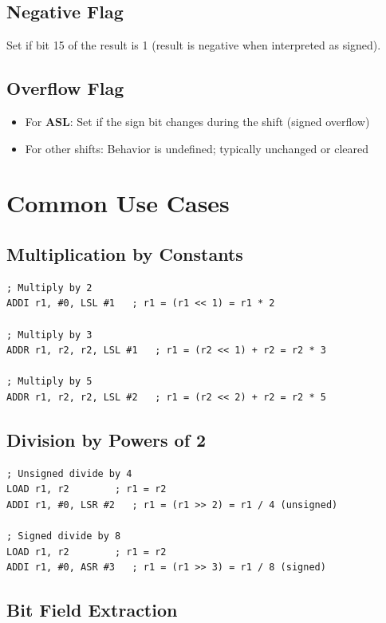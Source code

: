 \subsection{Negative Flag}

Set if bit 15 of the result is 1 (result is negative when interpreted as signed).

\subsection{Overflow Flag}

\begin{itemize}
	\item For \textbf{ASL}: Set if the sign bit changes during the shift (signed overflow)
	\item For other shifts: Behavior is undefined; typically unchanged or cleared
\end{itemize}

\section{Common Use Cases}

\subsection{Multiplication by Constants}

\begin{lstlisting}
; Multiply by 2
ADDI r1, #0, LSL #1   ; r1 = (r1 << 1) = r1 * 2

; Multiply by 3
ADDR r1, r2, r2, LSL #1   ; r1 = (r2 << 1) + r2 = r2 * 3

; Multiply by 5
ADDR r1, r2, r2, LSL #2   ; r1 = (r2 << 2) + r2 = r2 * 5
\end{lstlisting}

\subsection{Division by Powers of 2}

\begin{lstlisting}
; Unsigned divide by 4
LOAD r1, r2        ; r1 = r2
ADDI r1, #0, LSR #2   ; r1 = (r1 >> 2) = r1 / 4 (unsigned)

; Signed divide by 8
LOAD r1, r2        ; r1 = r2
ADDI r1, #0, ASR #3   ; r1 = (r1 >> 3) = r1 / 8 (signed)
\end{lstlisting}

\subsection{Bit Field Extraction}

